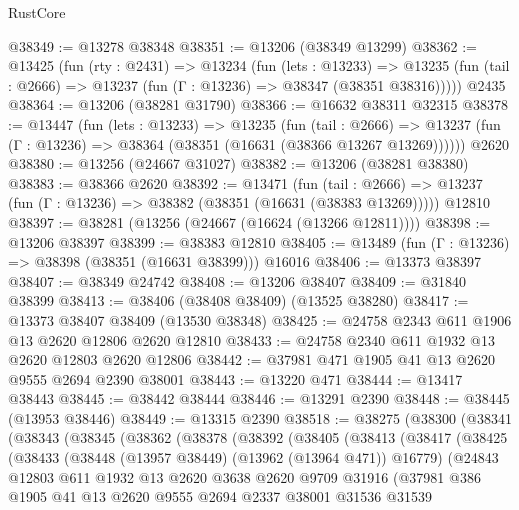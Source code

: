 \begin{lexlean}{RustCore}
\begin{coremodule}
@38349 := @13278 @38348
@38351 := @13206 (@38349 @13299)
@38362 := @13425
    (fun (rty : @2431) =>
    @13234
      (fun (lets : @13233) =>
      @13235 (fun (tail : @2666) => @13237 (fun (Γ : @13236) => @38347 (@38351 @38316)))))
    @2435
@38364 := @13206 (@38281 @31790)
@38366 := @16632 @38311 @32315
@38378 := @13447
    (fun (lets : @13233) =>
    @13235
      (fun (tail : @2666) =>
      @13237 (fun (Γ : @13236) => @38364 (@38351 (@16631 (@38366 @13267 @13269))))))
    @2620
@38380 := @13256 (@24667 @31027)
@38382 := @13206 (@38281 @38380)
@38383 := @38366 @2620
@38392 := @13471
    (fun (tail : @2666) => @13237 (fun (Γ : @13236) => @38382 (@38351 (@16631 (@38383 @13269)))))
    @12810
@38397 := @38281 (@13256 (@24667 (@16624 (@13266 @12811))))
@38398 := @13206 @38397
@38399 := @38383 @12810
@38405 := @13489 (fun (Γ : @13236) => @38398 (@38351 (@16631 @38399))) @16016
@38406 := @13373 @38397
@38407 := @38349 @24742
@38408 := @13206 @38407
@38409 := @31840 @38399
@38413 := @38406 (@38408 @38409) (@13525 @38280)
@38417 := @13373 @38407 @38409 (@13530 @38348)
@38425 := @24758 @2343 @611 @1906 @13 @2620 @12806 @2620 @12810
@38433 := @24758 @2340 @611 @1932 @13 @2620 @12803 @2620 @12806
@38442 := @37981 @471 @1905 @41 @13 @2620 @9555 @2694 @2390 @38001
@38443 := @13220 @471
@38444 := @13417 @38443
@38445 := @38442 @38444
@38446 := @13291 @2390
@38448 := @38445 (@13953 @38446)
@38449 := @13315 @2390
@38518 := @38275
    (@38300
      (@38341
        (@38343
          (@38345
            (@38362
              (@38378
                (@38392
                  (@38405
                    (@38413
                      (@38417
                        (@38425
                          (@38433
                            (@38448 (@13957 @38449) (@13962 (@13964 @471)) @16779)
                            (@24843
                              @12803
                              @611
                              @1932
                              @13
                              @2620
                              @3638
                              @2620
                              @9709
                              @31916
                              (@37981
                                @386
                                @1905
                                @41
                                @13
                                @2620
                                @9555
                                @2694
                                @2337
                                @38001
                                @31536
                                @31539

\end{coremodule}
\end{lexlean}
